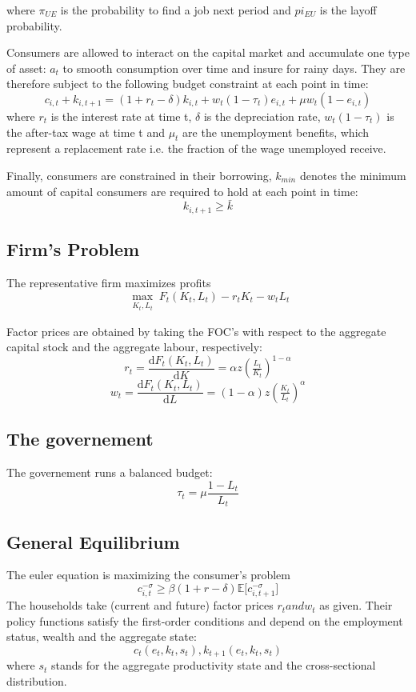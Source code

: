 \documentclass[a4paper,12pt]{article}
\begin{document}
where $\pi_{UE}$ is the probability to find a job next period and $pi_{EU}$ is the layoff probability. 

Consumers are allowed to interact on the capital market and accumulate one type of asset: $a_{t}$ to smooth consumption over time and insure for rainy days. They are therefore subject to the following budget constraint at each point in time: 
  \[ 
  c_{i,t} + k_{i,t+1} = (1 + r_{t} - \delta) k_{i,t} + w_{t} (1 - \tau_{t})  e_{i,t} + \mu w_{t} (1 - e_{i,t})
  \]
 where $r_{t}$ is the interest rate at time t, $\delta$ is the depreciation rate, $w_{t}(1-\tau_{t})$ is the after-tax wage at time t and $\mu_{t}$ are the unemployment benefits, which represent a replacement rate i.e. the fraction of the wage unemployed receive. 
  
Finally, consumers are constrained in their borrowing, $k_{min}$ denotes the minimum amount of capital consumers are required to hold at each point in time: 
   \[
   k_{i,t + 1} \geq \bar{k}
 	\]
	
\subsection{Firm's Problem}

The representative firm maximizes profits 
\[ \max_{\substack{K_{t},L_{t}}}F_{t}(K_{t},L_{t})-r_{t}K_{t}-w_{t}L_{t}
\]

Factor prices are obtained by taking the FOC's with respect to the aggregate capital stock and the aggregate labour, respectively: 
\[
r_{t} = \frac{\mathrm d F_{t}(K_{t},L_{t})}{\mathrm d K} = \alpha z (\tfrac{L_{t}}{K_{t}})^{1-\alpha} \]
\[
w_{t} = \frac{\mathrm d F_{t}(K_{t},L_{t})}{\mathrm d L} =(1-\alpha)z (\tfrac{K_{t}}{L_{t}})^{\alpha}
\]

\subsection{The governement}

The governement runs a balanced budget:
\[
\tau_{t}=\mu\frac{1-L_{t}}{L_{t}}
\]

\subsection{General Equilibrium}

The euler equation is maximizing the consumer's problem
\[ 
c_{i,t}^{- \sigma} \geq \beta (1+r -\delta){\mathbb{E}[c_{i,t+1}^{- \sigma}}]
\]
The households take (current and future) factor prices $r_{t} and w_{t}$ as given. Their policy functions satisfy the first-order conditions and depend on the employment status, wealth and the aggregate state: 
\[ c_{t}(e_{t},k_{t},s_{t}), k_{t+1}(e_{t},k_{t},s_{t})
\]
where $s_{t}$ stands for the aggregate productivity state and the cross-sectional distribution. 
\end{document}
